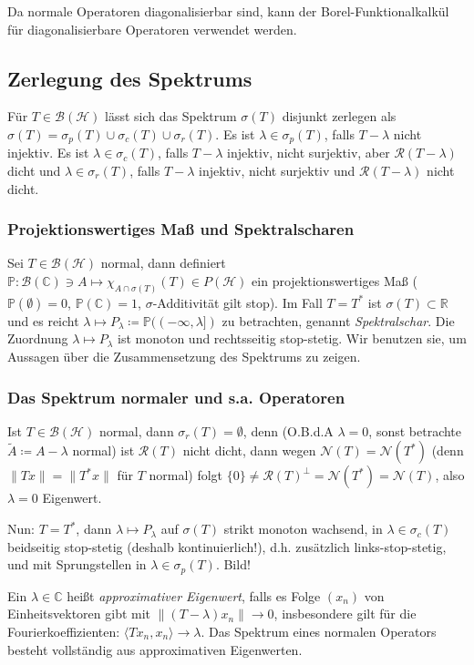 \documentclass[11pt,a4paper]{scrartcl}
\newcommand{\R}{\mathbb{R}} %
\newcommand{\C}{\mathbb{C}} %
\newcommand{\Hc}{\mathcal{H}}
\newcommand{\B}{\mathcal{B}}
\newcommand{\Nc}{\mathcal{N}}
\newcommand{\Rc}{\mathcal{R}}
\theoremstyle{plain}
\theoremstyle{definition}
\theoremstyle{remark}
\begin{document}
Da normale Operatoren diagonalisierbar sind, kann der Borel-Funktionalkalkül für diagonalisierbare Operatoren verwendet werden.

\subsection{Zerlegung des Spektrums}

Für $T\in \B(\Hc)$ lässt sich das Spektrum $\sigma(T)$ disjunkt zerlegen als $\sigma(T)=\sigma_p(T) \cup \sigma_c(T) \cup \sigma_r(T)$. Es ist $\lambda \in \sigma_p(T)$, falls $T-\lambda$ nicht injektiv. Es ist $\lambda \in \sigma_c(T)$, falls $T-\lambda$ injektiv, nicht surjektiv, aber $\Rc(T-\lambda)$ dicht und $\lambda \in \sigma_r(T)$, falls $T-\lambda$ injektiv, nicht surjektiv und $\Rc(T-\lambda)$ nicht dicht.

\subsubsection{Projektionswertiges Maß und Spektralscharen}

Sei $T\in \B(\Hc)$ normal, dann definiert $\mathbb{P}: \B(\C) \ni A \mapsto \chi_{A\cap \sigma(T)}(T) \in P(\Hc)$ ein projektionswertiges Maß ($\mathbb{P}(\emptyset) = 0$, $\mathbb{P}(\C) = 1$, $\sigma$-Additivität gilt stop). Im Fall $T=T^*$ ist $\sigma(T)\subset \R$ und es reicht $\lambda \mapsto P_\lambda \coloneqq \mathbb{P}((-\infty, \lambda])$ zu betrachten, genannt \emph{Spektralschar}. Die Zuordnung $\lambda \mapsto P_\lambda$ ist monoton und rechtsseitig stop-stetig. Wir benutzen sie, um Aussagen über die Zusammensetzung des Spektrums zu zeigen.

\subsubsection{Das Spektrum normaler und s.a. Operatoren}

Ist $T\in \B(\Hc)$ normal, dann $\sigma_r(T)=\emptyset$, denn (O.B.d.A $\lambda=0$, sonst betrachte $\tilde A \coloneqq A-\lambda$ normal) ist $\Rc(T)$ nicht dicht, dann wegen $\Nc(T)=\Nc(T^*)$ (denn $\|Tx\|=\|T^*x\|$ für $T$ normal) folgt $\{0\} \neq \Rc(T)^\bot = \Nc(T^*) = \Nc(T)$, also $\lambda=0$ Eigenwert.

Nun: $T=T^*$, dann $\lambda \mapsto P_\lambda$ auf $\sigma(T)$ strikt monoton wachsend, in $\lambda \in \sigma_c(T)$ beidseitig stop-stetig (deshalb kontinuierlich!), d.h. zusätzlich links-stop-stetig,  und mit Sprungstellen in $\lambda \in \sigma_p(T)$. Bild!

Ein $\lambda\in \C$ heißt \emph{approximativer Eigenwert}, falls es Folge $(x_n)$ von Einheitsvektoren gibt mit $\|(T-\lambda)x_n\| \to 0$, insbesondere gilt für die Fourierkoeffizienten: $\langle Tx_n, x_n \rangle \to \lambda$. Das Spektrum eines normalen Operators besteht vollständig aus approximativen Eigenwerten.
\end{document}
